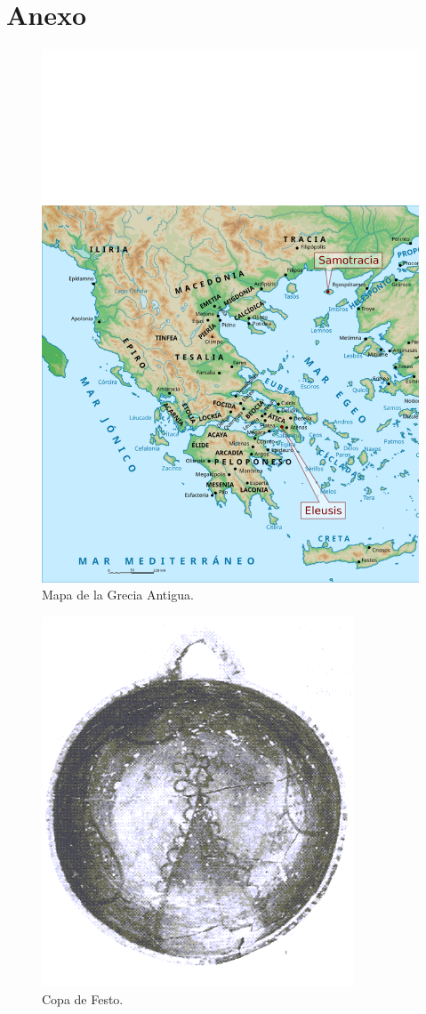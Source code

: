 \chapter{Anexo}
\begin{figure}[h!]
    \centering
    \includegraphics[width=0.85\linewidth]{Imagenes/MapaGreciaAntigua.png}
    \caption{Mapa de la Grecia Antigua.}
    \label{fig:mapa-grecia-antigua}
\end{figure}

\begin{figure}[h!]
	\centering
	\includegraphics[width=0.85\linewidth]{Imagenes/01-Copa de Festo.png}
	\caption{Copa de Festo.}
	\label{fig:copa-festo}
\end{figure}